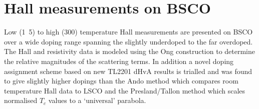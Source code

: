 \chapter{Hall measurements on \acs{BSCO}}
    \label{Sec:HallBSCO}

\begin{chapterabstract}
Low (\unit{1.5}{\kelvin}) to high (\unit{300}{\kelvin}) temperature Hall measurements are presented on \ac{BSCO} over a wide doping range spanning the slightly underdoped to the far overdoped. The Hall and resistivity data is modeled using the Ong construction to determine the relative magnitudes of the scattering terms. In addition a novel doping assignment scheme based on new \ac{TL2201} \ac{dHvA} results is trialled and was found to give slightly higher dopings than the Ando method which compares room temperature Hall data to \ac{LSCO} and the Presland/Tallon method which scales normalised $T_c$ values to a `universal' parabola.
\end{chapterabstract}










